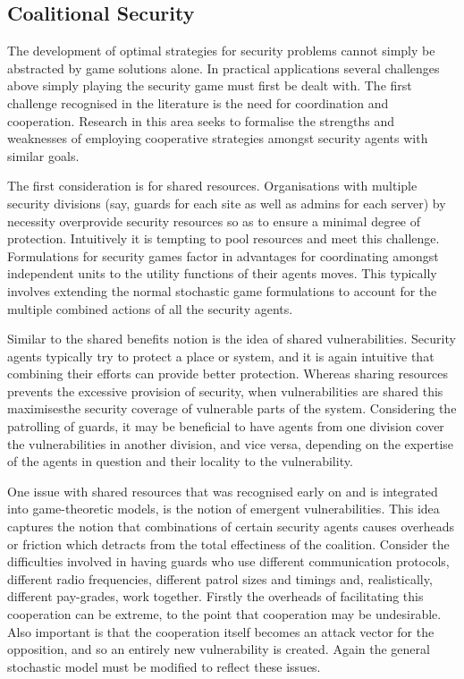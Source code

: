 \documentclass{article}
\begin{document}
\subsection{Coalitional Security}

The development of optimal strategies for security problems cannot simply be abstracted by game solutions alone.
In practical applications several challenges above simply playing the security game must first be dealt with.
The first challenge recognised in the literature is the need for coordination and cooperation.
Research in this area seeks to formalise the strengths and weaknesses of employing cooperative strategies amongst security agents with similar goals.

The first consideration is for shared resources.
Organisations with multiple security divisions (say, guards for each site as well as admins for each server) by necessity overprovide security resources so as to ensure a minimal degree of protection.
Intuitively it is tempting to pool resources and meet this challenge.
Formulations for security games factor in advantages for coordinating amongst independent units to the utility functions of their agents moves.
This typically involves extending the normal stochastic game formulations to account for the multiple combined actions of all the security agents.

Similar to the shared benefits notion is the idea of shared vulnerabilities.
Security agents typically try to protect a place or system, and it is again intuitive that combining their efforts can provide better protection.
Whereas sharing resources prevents the excessive provision of security, when vulnerabilities are shared this maximisesthe security coverage of vulnerable parts of the system.
Considering the patrolling of guards, it may be beneficial to have agents from one division cover the vulnerabilities in another division, and vice versa, depending on the expertise of the agents in question and their locality to the vulnerability.

One issue with shared resources that was recognised early on and is integrated into game-theoretic models, is the notion of emergent vulnerabilities.
This idea captures the notion that combinations of certain security agents causes overheads or friction which detracts from the total effectiness of the coalition.
Consider the difficulties involved in having guards who use different communication protocols, different radio frequencies, different patrol sizes and timings and, realistically, different pay-grades, work together.
Firstly the overheads of facilitating this cooperation can be extreme, to the point that cooperation may be undesirable.
Also important is that the cooperation itself becomes an attack vector for the opposition, and so an entirely new vulnerability is created.
Again the general stochastic model must be modified to reflect these issues.
\end{document}
